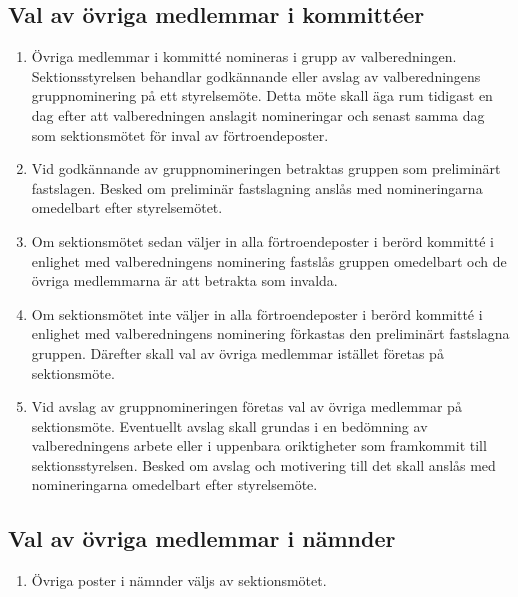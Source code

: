 \documentclass[11pt,a4paper]{article}
\begin{document}
\subsection{Val av övriga medlemmar i kommittéer}
	\begin{enumerate}[\thesubsection .1]
	
	\item Övriga medlemmar i kommitté nomineras i grupp av valberedningen. Sektionsstyrelsen
	behandlar godkännande eller avslag av valberedningens gruppnominering på ett styrelsemöte. Detta
	möte skall äga rum tidigast en dag efter att valberedningen anslagit nomineringar och senast samma
	dag som sektionsmötet för inval av förtroendeposter.
	
	\item Vid godkännande av gruppnomineringen betraktas gruppen som preliminärt fastslagen.
	Besked om preliminär fastslagning anslås med nomineringarna omedelbart efter styrelsemötet.
	
	\item Om sektionsmötet sedan väljer in alla förtroendeposter i berörd kommitté i enlighet med
	valberedningens nominering fastslås gruppen omedelbart och de övriga medlemmarna är att betrakta
	som invalda.
	
	\item Om sektionsmötet inte väljer in alla förtroendeposter i berörd kommitté i enlighet med
	valberedningens nominering förkastas den preliminärt fastslagna gruppen. Därefter skall val av
	övriga medlemmar istället företas på sektionsmöte.
	
	\item Vid avslag av gruppnomineringen företas val av övriga medlemmar på sektionsmöte. Eventuellt
	avslag skall grundas i en bedömning av valberedningens arbete eller i uppenbara oriktigheter
	som framkommit till sektionsstyrelsen. Besked om avslag och motivering till det skall anslås med
	nomineringarna omedelbart efter styrelsemöte.

	\end{enumerate}

\subsection{Val av övriga medlemmar i nämnder}
	\begin{enumerate}[\thesubsection .1]
	
	    \item Övriga poster i nämnder väljs av sektionsmötet. 
	    
	\end{enumerate}
\end{document}
